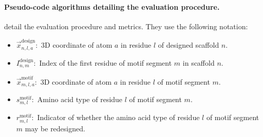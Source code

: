 \paragraph{Pseudo-code algorithms detailing the evaluation procedure.}
 detail the evaluation procedure and metrics. 
They use the following notation:
\begin{itemize}
\item{$\vec x_{n,l,a}^{\mathrm{design}}:$ 3D coordinate of atom $a$ in residue $l$ of designed scaffold $n$.}
\item{$I_{n, m}^{\mathrm{design}}:$ Index of the first residue of motif segment $m$ in scaffold $n$.  }
\item{$\vec x_{m,l, a}^{\mathrm{motif}}:$ 3D coordinate of atom $a$ in residue $l$ of motif segment $m.$} %
\item{$s_{m,l}^{\mathrm{motif}}:$ Amino acid type of residue $l$ of motif segment $m.$} %
\item{$r_{m,l}^{\mathrm{motif}}:$ Indicator of whether the amino acid type of residue $l$ of motif segment $m$ may be redesigned.}
\end{itemize}

